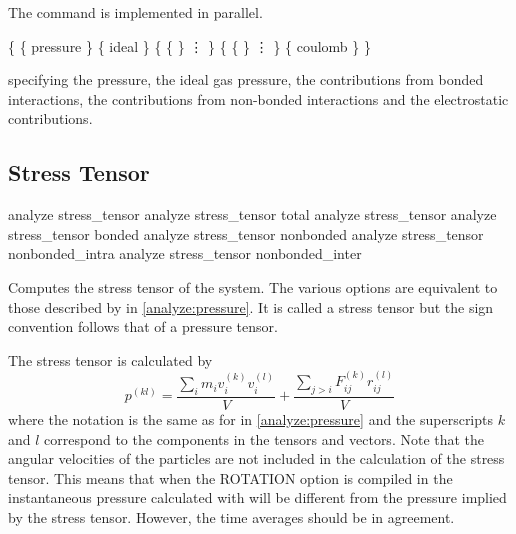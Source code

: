 The command is implemented in parallel.


\begin{code}
\{ \{ pressure  \}
   \{ ideal  \} 
   \{ \{   \}
      \vdots
   \}
   \{ \{   \}
      \vdots
   \}
   \{ coulomb  \}
\}
\end{code}
specifying the pressure, the ideal gas pressure, the
contributions from bonded interactions, the contributions from
non-bonded interactions and the electrostatic contributions.


\subsection{Stress Tensor}
\label{analyze:stresstensor}

\begin{essyntax}
   analyze stress_tensor
   analyze stress_tensor total
   analyze stress_tensor 
   analyze stress_tensor bonded 
   analyze stress_tensor nonbonded  
   analyze stress_tensor nonbonded_intra 
   analyze stress_tensor nonbonded_inter 
\end{essyntax}

Computes the stress tensor of the system.  The various options are equivalent to those described by
 in \vref{analyze:pressure}. It is called a stress tensor but the sign
convention follows that of a pressure tensor.


The stress tensor is calculated by 
\begin{equation}
  p^{(kl)} = \frac{\sum_{i} {m_{i}v_{i}^{(k)}v_{i}^{(l)}}}{V} + \frac{\sum_{j>i}{F_{ij}^{(k)}r_{ij}^{(l)}}}{V}
\end{equation}
where the notation is the same as for  in \vref{analyze:pressure} and the
superscripts $k$ and $l$ correspond to the components in the tensors and vectors.  Note that the
angular velocities of the particles are not included in the calculation of the stress tensor.  This
means that when the ROTATION option is compiled in the instantaneous pressure calculated with
 will be different from the pressure implied by
the stress tensor.  However, the time averages should be in agreement.


